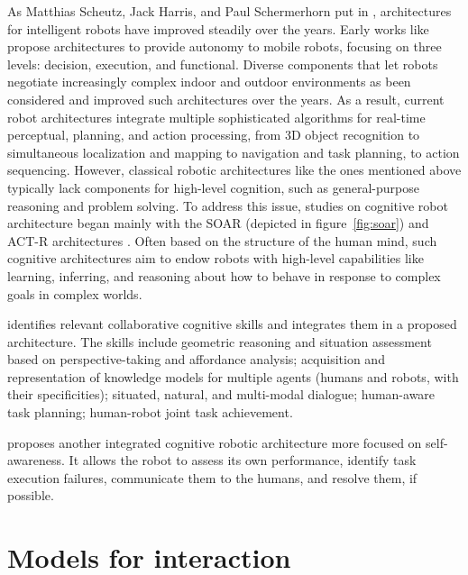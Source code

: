 As Matthias Scheutz, Jack Harris, and Paul Schermerhorn put in \cite{scheutz_systematic_2013}, architectures for intelligent robots have improved steadily over the years. 
Early works like \cite{alami_designing_1993,alami_architecture_1998,chatila_integrated_1992} propose architectures to provide autonomy to mobile robots, focusing on three levels: decision, execution, and functional. Diverse components that let robots negotiate increasingly complex indoor and outdoor environments as been considered and improved such architectures over the years. As a result, current robot architectures integrate multiple sophisticated algorithms for real-time perceptual, planning, and action processing, from 3D object recognition to simultaneous localization and mapping to navigation and task planning, to action sequencing. However, classical robotic architectures like the ones mentioned above typically lack components for high-level cognition, such as general-purpose reasoning and problem solving. 
To address this issue, studies on cognitive robot architecture began mainly with the SOAR (depicted in figure~\ref{fig:soar}) and ACT-R architectures \cite{laird_soar_1987,anderson2004integrated}.
Often based on the structure of the human mind, such cognitive architectures aim to endow robots with high-level capabilities like learning, inferring, and reasoning about how to behave in response to complex goals in complex worlds. 

\cite{lemaignan_artificial_2017} identifies relevant collaborative cognitive skills and integrates them in a proposed architecture. The skills include geometric reasoning and situation assessment based on perspective-taking and affordance analysis; acquisition and representation of knowledge models for multiple agents (humans and robots, with their specificities); situated, natural, and multi-modal dialogue; human-aware task planning; human-robot joint task achievement.

\cite{thierauf_toward_2024} proposes another integrated cognitive robotic architecture more focused on self-awareness. It allows the robot to assess its own performance, identify task execution failures, communicate them to the humans, and resolve them, if possible. 



\section{Models for interaction}


